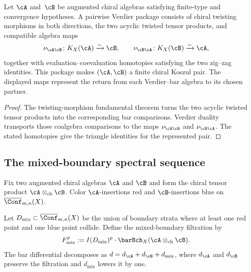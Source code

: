 \begin{theorem}
\label{thm:recognition-koszul-pairs}
Let $\cA$ and~$\cB$ be augmented chiral algebras satisfying
finite-type and convergence hypotheses.  A pairwise Verdier package
consists of chiral twisting morphisms in both directions, the two
acyclic twisted tensor products, and compatible algebra maps
\[
 \nu_{\cA\cB}\colon K_X(\cA)\xrightarrow{\sim}\cB,
 \qquad
 \nu_{\cB\cA}\colon K_X(\cB)\xrightarrow{\sim}\cA,
\]
together with evaluation--coevaluation homotopies satisfying the two
zig--zag identities.  This package makes $(\cA,\cB)$ a finite chiral
Koszul pair.  The displayed maps represent the return from each
Verdier--bar algebra to its chosen partner.
\end{theorem}

\begin{proof}
The twisting-morphism fundamental theorem turns the two acyclic
twisted tensor products into the corresponding bar comparisons.
Verdier duality transports those coalgebra comparisons to the maps
$\nu_{\cA\cB}$ and $\nu_{\cB\cA}$.  The stated homotopies give the
triangle identities for the represented pair.
\end{proof}

\subsection{The mixed-boundary spectral sequence}
\label{subsec:mixed-boundary-sseq}

Fix two augmented chiral algebras $\cA$ and $\cB$ and form the
chiral tensor product $\cA \otimes_{\mathrm{ch}} \cB$. Color
$\cA$-insertions red and $\cB$-insertions blue on
$\overline{\Conf}_{m,n}(X)$.

\begin{definition}
\label{def:mixed-boundary-filtration}
Let $D_{\mathrm{mix}} \subset \overline{\Conf}_{m,n}(X)$ be the
union of boundary strata where at least one red point and one blue
point collide. Define the mixed-boundary filtration by
\[
F^p_{\mathrm{mix}}
:= I(D_{\mathrm{mix}})^p \cdot
 \barBch_X(\cA \otimes_{\mathrm{ch}} \cB).
\]
The bar differential decomposes as
$d = d_\cA + d_\cB + d_{\mathrm{mix}}$, where $d_\cA$ and $d_\cB$
preserve the filtration and $d_{\mathrm{mix}}$ lowers it by one.
\end{definition}

